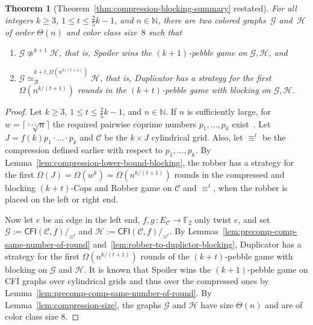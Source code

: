 \documentclass[10pt,a4paper]{article}
\newcommand{\comp}{\equiv}
\newcommand{\CFIsym}{\mathsf{CFI}}
\newcommand{\CFI}[1]{\CFIsym(#1)}
\newcommand{\compCFI}[2]{\CFI{#1}/_{#2}}
\newcommand{\nat}{\mathbb{N}}
\newcommand{\FF}{\mathbb{F}}
\newcommand{\graphG}{\mathcal{G}}
\newcommand{\graphH}{\mathcal{H}}
\newcommand{\edgeC}{E_{\mathcal{C}}}
\newcommand{\kbequivr}[2]{\simeq_{\mathcal{B}}^{#1,#2}}
\newcommand{\notkequiv}[1]{\not\simeq^{#1}}
\newtheorem{theorem}{Theorem}
\begin{document}
\begin{theorem}[Theorem~\ref{thm:compression-blocking-summary} restated]
	For all integers $k\geq 3$, $1\leq t \leq \frac{2}{5}k-1$, and $n\in \nat$,
	there are  
	two colored graphs~$\graphG$ and~$\graphH$ of order $\Theta(n)$ and color class size~$8$
	such that
	\begin{enumerate}
		\item $\graphG \notkequiv{k+1} \graphH$, that is, Spoiler wins the $(k+1)$-pebble game on $\graphG, \graphH$,
		and 
		\item $\graphG \kbequivr{k+t}{\Omega(n^{k/(t+1)})} \graphH $,
		that is, Duplicator has a strategy for the first $\Omega(n^{k/(t+1)})$
		rounds in the $(k+t)$-pebble game with blocking on $\graphG, \graphH$.
	\end{enumerate}
\end{theorem}
\begin{proof}
	Let $k \geq 3$, $1\leq t \leq  \frac{2}{5}k-1$, and $n \in \nat$.
	If $n$ is sufficiently large,
	for $w = \lceil\sqrt[t+1]{n} \rceil$ the required pairwise coprime numbers $p_1,\dots, p_k$ exist~\cite{DBLP:conf/focs/GroheLNS23}.
	Let $J = f(k) p_1\cdot\ldots \cdot p_k$
	and $\mathcal{C}$ be the $k\times J$ cylindrical grid.
	Also, let $\comp^t$ be the compression defined earlier with respect
	to $p_1,\dots, p_k$.
	By Lemma~\ref{lem:compression-lower-bound-blocking},
	the robber has a strategy for the first $\Omega( J) = \Omega(w^k) = \Omega(n^{k/(t+1)})$
	rounds in the compressed and blocking $(k+t)$-Cops and Robber game
	on $\mathcal{C}$ and $\comp^t$, when the robber is placed on the left or right end. 
	
	Now let $e$ be an edge in the left end,
	$f,g \, \colon \edgeC \to \FF_2$ only twist $e$,
	and set $\graphG :=\compCFI{\mathcal{C},f}{\comp^t}$ and $\graphH :=\compCFI{\mathcal{C},f}{\comp^t}$.
	By Lemmas~\ref{lem:precomp-comp-same-number-of-round}
	and~\ref{lem:robber-to-duplictor-blocking},
	Duplicator has a strategy for the first  $\Omega(n^{k/(t+1)})$
	rounds of the $(k+t)$-pebble game with blocking
	on $\graphG$ and $\graphH$.
	It is known that Spoiler wins the $(k+1)$-pebble game
	on CFI graphs over cylindrical grids and thus over the compressed ones
	by Lemma~\ref{lem:precomp-comp-same-number-of-round}.
	By Lemma~\ref{lem:compression-size},
	the graphs $\graphG$ and $\graphH$ have size $\Theta(n)$
	and are of color class size $8$.
\end{proof}
         
\end{document}
